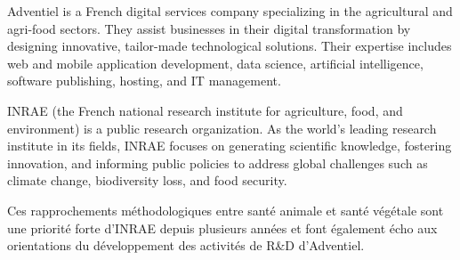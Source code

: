 Adventiel is a French digital services company specializing in the agricultural and agri-food sectors. They assist businesses in their digital transformation by designing innovative, tailor-made technological solutions. Their expertise includes web and mobile application development, data science, artificial intelligence, software publishing, hosting, and IT management. 

INRAE (the French national research institute for agriculture, food, and environment) is a public research organization. As the world's leading research institute in its fields, INRAE focuses on generating scientific knowledge, fostering innovation, and informing public policies to address global challenges such as climate change, biodiversity loss, and food security.

Ces rapprochements méthodologiques entre santé animale et santé végétale sont une priorité forte d’INRAE depuis plusieurs années et font également écho aux orientations du développement des activités de R\&D d’Adventiel. 

